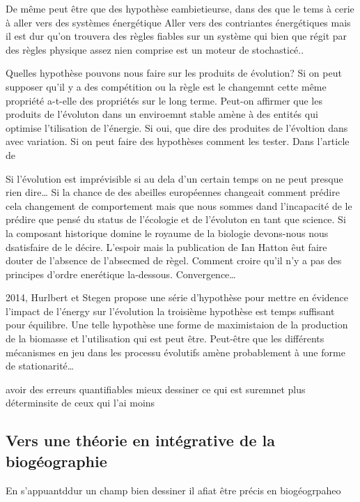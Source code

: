 De même peut être que des hypothèse eambietieurse, dans des que le tems
à cerie à aller vers des systèmes énergétique Aller vers des contriantes
énergétiques mais il est dur qu'on trouvera des règles fiables sur un
système qui bien que régit par des règles physique assez nien comprise
est un moteur de stochasticé..

Quelles hypothèse pouvons nous faire sur les produits de évolution? Si
on peut supposer qu'il y a des compétition ou la règle est le changemnt
cette même propriété a-t-elle des propriétés sur le long terme. Peut-on
affirmer que les produits de l'évoluton dans un enviroemnt stable amène
à des entités qui optimise l'tilisation de l'énergie. Si oui, que dire
des produites de l'évoltion dans avec variation. Si on peut faire des
hypothèses comment les tester. Dans l'article de

Si l'évolution est imprévisible si au dela d'un certain temps on ne peut
presque rien dire\ldots{} Si la chance de des abeilles européennes
changeait comment prédire cela changement de comportement mais que nous
sommes dand l'incapacité de le prédire que pensé du status de l'écologie
et de l'évoluton en tant que science. Si la composant historique domine
le royaume de la biologie devons-nous nous dsatisfaire de le décire.
L'espoir mais la publication de Ian Hatton êut faire douter de l'absence
de l'absecmed de règel. Comment croire qu'il n'y a pas des principes
d'ordre enerétique la-dessous. Convergence\ldots{}

2014, Hurlbert et Stegen propose une série d'hypothèse pour mettre en
évidence l'impact de l'énergy sur l'évolution la troisième hypothèse est
temps suffisant pour équilibre. Une telle hypothèse une forme de
maximistaion de la production de la biomasse et l'utilisation qui est
peut être. Peut-être que les différents mécanismes en jeu dans les
processu évolutifs amène probablement à une forme de
stationarité\ldots{}

avoir des erreurs quantifiables mieux dessiner ce qui est suremnet plus
déterminsite de ceux qui l'ai moins

\subsection*{Vers une théorie en intégrative de la
biogéographie}\label{vers-une-thuxe9orie-en-intuxe9grative-de-la-bioguxe9ographie}

En s'appuantddur un champ bien dessiner il afiat être précis en
biogéogrpaheo

